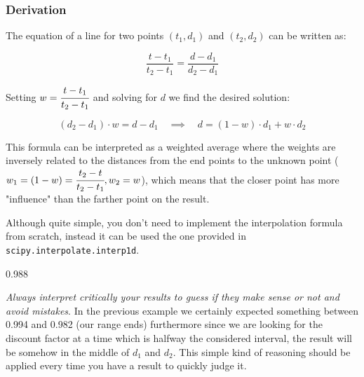 \begin{attention}
\subsubsection{Derivation}
The equation of a line for two points $(t_1, d_1)$ and $(t_2, d_2)$ can be written as:

\begin{equation}
\frac{t - t_1}{t_2 - t_1} = \frac{d - d_1}{d_2 - d_1}
\end{equation}

Setting $w = \cfrac{t - t_1}{t_2 - t_1}$ and solving for $d$ we find the desired solution:

\begin{equation}
(d_2 - d_1)\cdot w = d - d_1\quad\implies\quad d = (1 - w)\cdot d_1 + w \cdot d_2
\end{equation}

This formula can be interpreted as a weighted average where the weights are inversely related to the distances from the end points to the unknown 
point ($w_1 = (1 - w) = \cfrac{t_2 - t}{t_2 -t_1}, w_2 = w$), which means that the closer point has more "influence" than the farther point on the result.
\end{attention}

Although quite simple, you don't need to implement the interpolation formula from scratch, instead it can be used the one provided in 
\texttt{scipy.interpolate.interp1d}. 


\begin{ioutput}
0.988
\end{ioutput}

\emph{Always interpret critically your results to guess if they make sense or not and avoid mistakes}. In the previous example we certainly expected 
something between 0.994 and 0.982 (our range ends) furthermore since we are looking for the discount factor at a time which is halfway the considered 
interval, the result will be somehow in the middle of $d_1$ and $d_2$. This simple kind of reasoning should be applied every time you have a result to 
quickly judge it.

